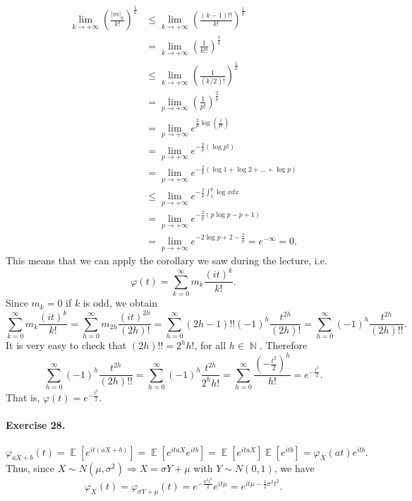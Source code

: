 \documentclass[12pt,a4paper]{report}
\theoremstyle{definition}
\theoremstyle{num.custom-title}
\DeclareMathOperator{\N}{\mathbb{N}}
\DeclareMathOperator{\E}{\mathbb{E}}
\DeclareMathOperator{\imp}{\Rightarrow}
\renewcommand{\phi}{\varphi}
\renewcommand{\1}{\mathbbm{1}}
\begin{document}
\begin{align*}
\lim_{k \to +\infty} \left( \frac{|m|_k}{k!} \right)^{\frac{1}{k}}
&\leq \lim_{k \to +\infty} \left( \frac{(k-1)!!}{k!} \right)^{\frac{1}{k}}\\ 
&= \lim_{k \to +\infty} \left( \frac{1}{k!!} \right)^{\frac{1}{k}} \tag{since $k!! \geq (k/2)!$}\\
&\leq \lim_{k \to +\infty} \left( \frac{1}{(k/2)!} \right)^{\frac{1}{k}}\\
&= \lim_{p \to +\infty} \left( \frac{1}{p!} \right)^{\frac{2}{p}}\\
&= \lim_{p \to +\infty} e^{ {\frac{2}{p}} \log \left( \frac{1}{p!} \right)}\\
&= \lim_{p \to +\infty} e^{ - {\frac{2}{p}} \left( \log p! \right)}\\
&= \lim_{p \to +\infty} e^{ - {\frac{2}{p}} \left( \log 1 + \log 2 + ... + \log p \right)}\\
&\leq \lim_{p \to +\infty} e^{ - {\frac{2}{p}} \int_1^p \log x dx} \tag{thanks to the lemma}\\
&= \lim_{p \to +\infty} e^{ - {\frac{2}{p}} \left( p \log p -p +1 \right) }\\
&= \lim_{p \to +\infty} e^{ - 2 \log p +2 -\frac{2}{p} } = e^{-\infty} = 0.
\end{align*}
This means that we can apply the corollary we saw during the lecture, i.e.
\[
\phi(t)= \sum_{k=0}^\infty m_k \frac{(it)^k}{k!}.
\]
Since $m_k=0$ if $k$ is odd, we obtain
\[
\sum_{k=0}^\infty m_k \frac{(it)^k}{k!} 
= \sum_{h=0}^\infty m_{2h} \frac{(it)^{2h}}{(2h)!} 
= \sum_{h=0}^\infty (2h-1)!! (-1)^h \frac{t^{2h}}{(2h)!}
= \sum_{h=0}^\infty (-1)^h \frac{t^{2h}}{(2h)!!}.
\]
It is very easy to check that $(2h)!!=2^h h!$, for all $h \in \N$. Therefore
\[
\sum_{h=0}^\infty (-1)^h \frac{t^{2h}}{(2h)!!} 
= \sum_{h=0}^\infty (-1)^h \frac{t^{2h}}{2^h h!}
= \sum_{h=0}^\infty \frac{\left( -\frac{t^2}{2} \right)^h}{h!}
= e^{-\frac{t^2}{2}}.
\]
That is, $\phi(t)= e^{-\frac{t^2}{2}}$.

\paragraph{Exercise 28.}
\[
\phi_{aX+b}(t) = \E \left[ e^{it(aX+b)} \right] = \E \left[ e^{itaX}e^{itb} \right] = \E \left[ e^{itaX} \right] \E \left[ e^{itb} \right] = \phi_X(at) e^{itb}.
\]
Thus, since $X \sim N(\mu, \sigma^2) \imp X=\sigma Y+\mu$ with $Y \sim N(0,1)$, we have
\[
\phi_X(t)=\phi_{\sigma Y+\mu}(t)=e^{-\frac{\sigma^2t^2}{2}} e^{it\mu} = e^{it\mu-\frac{1}{2} \sigma^2t^2}.
\]
\end{document}
